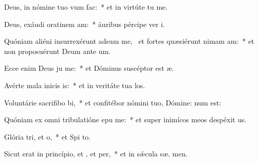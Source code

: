 \item Deus, in nómine tuo vum  fac:~* et in virtúte tu  me.
\item Deus, exáudi oratinem am:~* áuribus pércipe ver  i.
\item Quóniam aliéni insurrexérunt adsum me,~\pscross{} et fortes quæsiérunt nimam am:~* et non proposuérunt Deum ante  um.
\item Ecce enim Deus ju me:~* et Dóminus suscéptor est  æ.
\item Avérte mala inicis is:~* et in veritáte tua  los.
\item Voluntárie sacrifibo bi,~* et confitébor nómini tuo, Dómine:  num est:
\item Quóniam ex omni tribulatióne epu me:~* et super inimícos meos despéxit  us.
\item Glória tri, et o,~* et Spi to.
\item Sicut erat in princípio, et , et per,~* et in sǽcula sæ. men.
